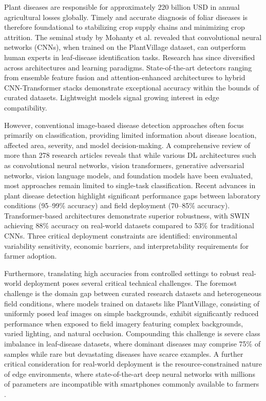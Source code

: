 \documentclass[10pt,a4paper,twocolumn]{article}
\begin{document}
Plant diseases are responsible for approximately 220 billion USD in annual agricultural losses globally. Timely and accurate diagnosis of foliar diseases is therefore foundational to stabilizing crop supply chains and minimizing crop attrition. The seminal study by Mohanty et al. revealed that convolutional neural networks (CNNs), when trained on the PlantVillage dataset, can outperform human experts in leaf-disease identification tasks. Research has since diversified across architectures and learning paradigms. State-of-the-art detectors ranging from ensemble feature fusion and attention-enhanced architectures to hybrid CNN-Transformer stacks demonstrate exceptional accuracy within the bounds of curated datasets. Lightweight models signal growing interest in edge compatibility.

However, conventional image-based disease detection approaches often focus primarily on classification, providing limited information about disease location, affected area, severity, and model decision-making. A comprehensive review of more than 278 research articles \cite{upadhyay2025deep} reveals that while various DL architectures such as convolutional neural networks, vision transformers, generative adversarial networks, vision language models, and foundation models have been evaluated, most approaches remain limited to single-task classification. Recent advances in plant disease detection \cite{shafay2025recent} highlight significant performance gaps between laboratory conditions (95--99\% accuracy) and field deployment (70--85\% accuracy). Transformer-based architectures demonstrate superior robustness, with SWIN achieving 88\% accuracy on real-world datasets compared to 53\% for traditional CNNs. Three critical deployment constraints are identified: environmental variability sensitivity, economic barriers, and interpretability requirements for farmer adoption.

Furthermore, translating high accuracies from controlled settings to robust real-world deployment poses several critical technical challenges. The foremost challenge is the domain gap between curated research datasets and heterogeneous field conditions, where models trained on datasets like PlantVillage, consisting of uniformly posed leaf images on simple backgrounds, exhibit significantly reduced performance when exposed to field imagery featuring complex backgrounds, varied lighting, and natural occlusion. Compounding this challenge is severe class imbalance in leaf-disease datasets, where dominant diseases may comprise 75\% of samples while rare but devastating diseases have scarce examples. A further critical consideration for real-world deployment is the resource-constrained nature of edge environments, where state-of-the-art deep neural networks with millions of parameters are incompatible with smartphones commonly available to farmers \cite{khan2023plant}.
\end{document}
